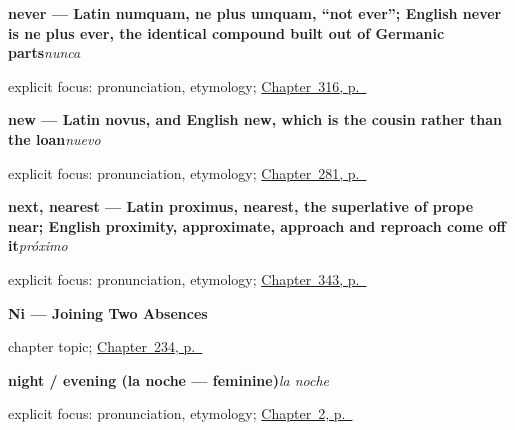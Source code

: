 \noindent\begin{minipage}[t]{\linewidth}
\raggedright
\textbf{never — Latin numquam, ne plus umquam, \textquotedblleft{}not ever\textquotedblright{}; English never is ne plus ever, the identical compound built out of Germanic parts}\enspace\emph{nunca}\par
\footnotesize explicit focus: pronunciation, etymology; \hyperref[ch:nunca-y-siempre]{Chapter~316, p.~\pageref*{ch:nunca-y-siempre}}
\end{minipage}\par\smallskip

\noindent\begin{minipage}[t]{\linewidth}
\raggedright
\textbf{new — Latin novus, and English new, which is the cousin rather than the loan}\enspace\emph{nuevo}\par
\footnotesize explicit focus: pronunciation, etymology; \hyperref[ch:cuatro-adjetivos]{Chapter~281, p.~\pageref*{ch:cuatro-adjetivos}}
\end{minipage}\par\smallskip

\noindent\begin{minipage}[t]{\linewidth}
\raggedright
\textbf{next, nearest — Latin proximus, nearest, the superlative of prope near; English proximity, approximate, approach and reproach come off it}\enspace\emph{próximo}\par
\footnotesize explicit focus: pronunciation, etymology; \hyperref[ch:la-fecha-y-el-siglo]{Chapter~343, p.~\pageref*{ch:la-fecha-y-el-siglo}}
\end{minipage}\par\smallskip

\noindent\begin{minipage}[t]{\linewidth}
\raggedright
\textbf{Ni --- Joining Two Absences}\par
\footnotesize chapter topic; \hyperref[ch:ni]{Chapter~234, p.~\pageref*{ch:ni}}
\end{minipage}\par\smallskip

\noindent\begin{minipage}[t]{\linewidth}
\raggedright
\textbf{night / evening (la noche — feminine)}\enspace\emph{la noche}\par
\footnotesize explicit focus: pronunciation, etymology; \hyperref[ch:greetings]{Chapter~2, p.~\pageref*{ch:greetings}}
\end{minipage}\par\smallskip

